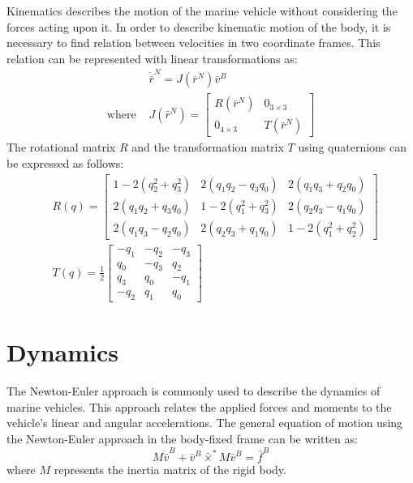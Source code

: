     Kinematics describes the motion of the marine vehicle without considering the forces acting upon it.
    In order to describe kinematic motion of the body, it is necessary to find relation between velocities in two coordinate frames.
    This relation can be represented with linear transformations as:
    $$
    \begin{aligned}
        & \dot{\bar{r}}^N=J(\bar{r}^N) \bar{v}^B \\
        \text{where } & J(\bar{r}^N)=\left[\begin{array}{cc}
        R(\bar{r}^N) & 0_{3 \times 3} \\
        0_{4 \times 3} & T(\bar{r}^N)
        \end{array}\right]
    \end{aligned}
    $$
    The rotational matrix $R$ and the transformation matrix $T$ using quaternions can be expressed as follows:
    $$
    \begin{aligned}
    & R(q)=\left[\begin{array}{ccc}
        1-2\left(q_2^2+q_3^2\right) & 2\left(q_1 q_2-q_3 q_0\right) & 2\left(q_1 q_3+q_2 q_0\right) \\
        2\left(q_1 q_2+q_3 q_0\right) & 1-2\left(q_1^2+q_3^2\right) & 2\left(q_2 q_3-q_1 q_0\right) \\
        2\left(q_1 q_3-q_2 q_0\right) & 2\left(q_2 q_3+q_1 q_0\right) & 1-2\left(q_1^2+q_2^2\right)
        \end{array}\right]\\
    & T(q)=\frac{1}{2}\left[\begin{array}{rrr}
        -q_1 & -q_2 & -q_3 \\
        q_0 & -q_3 & q_2 \\
        q_3 & q_0 & -q_1 \\
        -q_2 & q_1 & q_0
        \end{array}\right]
    \end{aligned}
    $$

\section{Dynamics}

    The Newton-Euler approach is commonly used to describe the dynamics of marine vehicles.
    This approach relates the applied forces and moments to the vehicle's linear and angular accelerations.
    The general equation of motion using the Newton-Euler approach in the body-fixed frame can be written as:
    $$
    M\dot{\bar{v}}^B+\bar{v}^B\bar{\times}^*M\bar{v}^B=\bar{f}^B
    $$
    where $M$ represents the inertia matrix of the rigid body.

